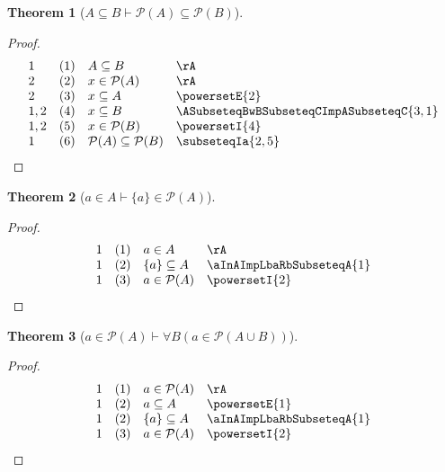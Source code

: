 \documentclass{book}
\theoremstyle{plain}
\newtheorem{theorem}{Theorem}
\theoremstyle{remark}
\theoremstyle{definition}
\begin{document}
\label{ASubseteqBImpPowersetLpARpSubseteqPowersetLpBRp}
\begin{theorem}[\(A \subseteq B \vdash \mathcal{P}(A) \subseteq \mathcal{P}(B)\)]
\end{theorem}
\begin{proof}
	\[
	\begin{array}{llll}
		1 & (1) & A \subseteq B & \rA \\
		2 & (2) & x\in\mathcal{P}(A) & \rA \\
		2 & (3) & x\subseteq A & \powersetE{2} \\
		1,2 & (4) & x\subseteq B & \ASubseteqBwBSubseteqCImpASubseteqC{3,1} \\
		1,2 & (5) & x\in \mathcal{P}(B) & \powersetI{4} \\
		1 & (6) & \mathcal{P}(A)\subseteq \mathcal{P}(B) & \subseteqIa{2,5} \\
	\end{array}
	\]
\end{proof}

\label{aInAImpLbaRbInPowersetLpARp}
\begin{theorem}[\(a\in A \vdash \{a\}\in\mathcal{P}(A)\)]
\end{theorem}

\begin{proof}
	\[
	\begin{array}{llll}
		1 & (1) & a \in A & \rA \\
		1 & (2) & \{a\}\subseteq A & \aInAImpLbaRbSubseteqA{1} \\
		1 & (3) & a\in\mathcal{P}(A) & \powersetI{2} \\
	\end{array}
	\]
\end{proof}

\label{aInPowersetLpARpImpFaBLpaInPowersetLpAcuBRpRp}
\begin{theorem}[\(a\in \mathcal{P}(A) \vdash \forall B(a\in\mathcal{P}(A\cup B))\)]
\end{theorem}
\begin{proof}
	\[
	\begin{array}{llll}
		1 & (1) & a\in \mathcal{P}(A) & \rA \\
		1 & (2) & a\subseteq A & \powersetE{1} \\
		1 & (2) & \{a\}\subseteq A & \aInAImpLbaRbSubseteqA{1} \\
		1 & (3) & a\in\mathcal{P}(A) & \powersetI{2} \\
	\end{array}
	\]
\end{proof}
\end{document}
